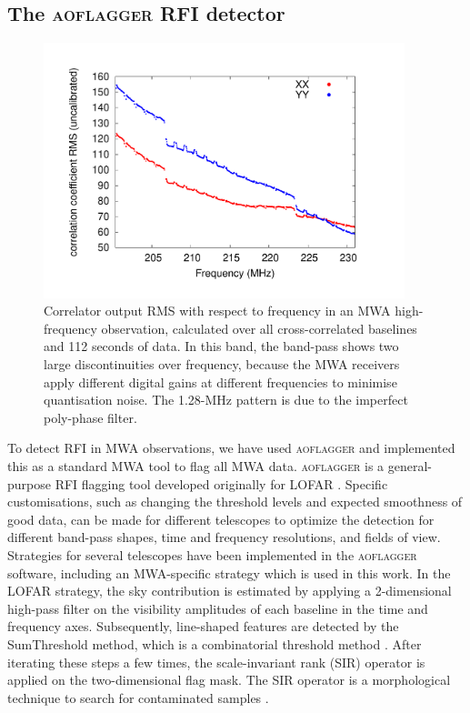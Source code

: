 \documentclass{pasa}
\begin{document}
\subsection{The \textsc{aoflagger} RFI detector}

\begin{figure}
\begin{center}\hspace*{-0.8cm}\includegraphics[width=10.5cm]{img/bandpass}
\caption{Correlator output RMS with respect to frequency in an MWA high-frequency observation, calculated over all cross-correlated baselines and 112 seconds of data. In this band, the band-pass shows two large discontinuities over frequency, because the MWA receivers apply different digital gains at different frequencies to minimise quantisation noise. The 1.28-MHz pattern is due to the imperfect poly-phase filter.
}
\label{fig:bandpass}
\end{center}
\end{figure}

To detect RFI in MWA observations, we have used \textsc{aoflagger} and implemented this as a standard MWA tool to flag all MWA data. \textsc{aoflagger} is a general-purpose RFI flagging tool developed originally for LOFAR \citep{lofar-radio-environment}. Specific customisations, such as changing the threshold levels and expected smoothness of good data, can be made for different telescopes to optimize the detection for different band-pass shapes, time and frequency resolutions, and fields of view. Strategies for several telescopes have been implemented in the \textsc{aoflagger} software, including an MWA-specific strategy which is used in this work. In the LOFAR strategy, the sky contribution is estimated by applying a 2-dimensional high-pass filter on the visibility amplitudes of each baseline in the time and frequency axes. Subsequently, line-shaped features are detected by the SumThreshold method, which is a combinatorial threshold method \citep{post-correlation-rfi-classification}. After iterating these steps a few times, the scale-invariant rank (SIR) operator is applied on the two-dimensional flag mask. The SIR operator is a morphological technique to search for contaminated samples \citep{scale-invariant-rank-operator}.
\end{document}
